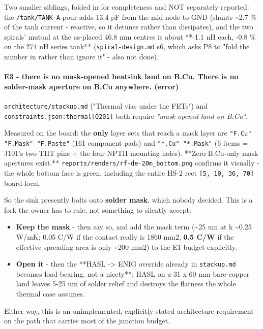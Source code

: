 \documentclass[11pt,a4paper]{article}
\begin{document}
Two smaller siblings, folded in for completeness and NOT separately reported: the \texttt{/tank/TANK\_A} pour adds 13.4 pF from the mid-node to GND (shunts \textasciitilde{}2.7 \% of the tank current - reactive, so it detunes rather than dissipates), and the two spirals' mutual at the as-placed 46.8 mm centres is about {*}{*}-1.1 nH each, -0.8 \% on the 274 nH series tank{*}{*} (\texttt{spiral-design.md} s6, which asks P8 to "fold the number in rather than ignore it" - also not done).

\paragraph*{E3 - there is no mask-opened heatsink land on B.Cu. There is no solder-mask aperture on B.Cu anywhere. (error)}
\texttt{architecture/stackup.md} ("Thermal vias under the FETs") and \texttt{constraints.json:thermal{[}Q201{]}} both require \emph{"mask-opened land on B.Cu"}.

Measured on the board: the \textbf{only} layer sets that reach a mask layer are \texttt{"F.Cu" "F.Mask" "F.Paste"} (161 component pads) and \texttt{"{*}.Cu" "{*}.Mask"} (6 items = J101's two THT pins + the four NPTH mounting holes). {*}{*}Zero B.Cu-only mask apertures exist.{*}{*} \texttt{reports/renders/rf-de-20m\_bottom.png} confirms it visually - the whole bottom face is green, including the entire HS-2 rect \texttt{{[}5, 10, 36, 70{]}} board-local.

So the sink presently bolts onto \textbf{solder mask}, which nobody decided. This is a fork the owner has to rule, not something to silently accept:

\begin{itemize}
\item \textbf{Keep the mask} - then say so, and add the mask term (\textasciitilde{}25 um at
k \textasciitilde{}0.25 W/mK; 0.05 C/W if the contact really is 1860 mm2, \textbf{0.5 C/W} if the
effective spreading area is only \textasciitilde{}200 mm2) to the E1 budget explicitly.
\item \textbf{Open it} - then the {*}{*}HASL -\textgreater{} ENIG override already in \texttt{stackup.md} becomes
load-bearing, not a nicety{*}{*}: HASL on a 31 x 60 mm bare-copper land leaves
5-25 um of solder relief and destroys the flatness the whole thermal case
assumes.
\end{itemize}
Either way, this is an unimplemented, explicitly-stated architecture requirement on the path that carries most of the junction budget.
\end{document}
